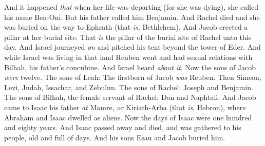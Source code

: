\begin{biblechapter}
\verse And it happened \textit{that} when her life was departing (for she was dying), she called his name Ben-Oni. But his father called him Benjamin.
\verse And Rachel died and she was buried on the way to Ephrath (that \textit{is}, Bethlehem).
\verse And Jacob erected a pillar at her burial site. That \textit{is} the pillar of the burial site of Rachel unto this day.
\verse And Israel journeyed \textit{on} and pitched his tent beyond the tower of Eder.
\verse And while Israel was living in that land Reuben went and had sexual relations with Bilhah, his father’s concubine. And Israel heard \textit{about it}.
 Now the sons of Jacob \textit{were} twelve.
\verse The sons of Leah: The firstborn of Jacob \textit{was} Reuben. Then Simeon, Levi, Judah, Issachar, and Zebulun.
\verse The sons of Rachel: Joseph and Benjamin.
\verse The sons of Bilhah, the female servant of Rachel: Dan and Naphtali.
 And Jacob came to Isaac his father \textit{at} Mamre, \textit{or} Kiriath-Arba (that \textit{is}, Hebron), where Abraham and Isaac dwelled as aliens.
\verse Now the days of Isaac were one hundred and eighty years.
\verse And Isaac passed away and died, and was gathered to his people, old and full of days. And his sons Esau and Jacob buried him.
\end{biblechapter}

